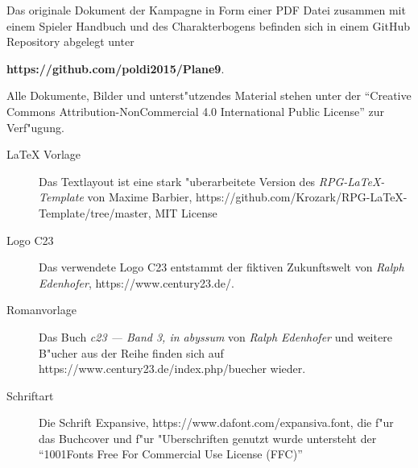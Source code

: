 \newpage
\pagestyle{empty}



Das originale  Dokument der Kampagne in Form einer PDF Datei zusammen mit einem Spieler Handbuch und des Charakterbogens
befinden sich in einem GitHub Repository abgelegt unter 

\textbf{https://github.com/poldi2015/Plane9}. 

Alle Dokumente, Bilder und unterst"utzendes Material stehen unter der ``Creative Commons Attribution-NonCommercial 4.0 
International Public License'' zur Verf"ugung.


\begin{description}
    \item [LaTeX Vorlage] Das Textlayout ist eine stark "uberarbeitete Version des \textit{RPG-LaTeX-Template} von 
        Maxime Barbier, https://github.com/Krozark/RPG-LaTeX-Template/tree/master, MIT License
    \item [Logo C23] Das verwendete Logo C23 entstammt der fiktiven Zukunftswelt von \emph{Ralph  Edenhofer}, 
        \newline{}https://www.century23.de/.
    \item [Romanvorlage] Das Buch \emph{c23 --- Band 3, in abyssum} von \emph{Ralph Edenhofer} und weitere B"ucher aus der Reihe finden 
        sich auf https://www.century23.de/index.php/buecher wieder.
    \item [Schriftart] Die Schrift Expansive, https://www.dafont.com/expansiva.font, die f"ur das Buchcover und f"ur
        "Uberschriften genutzt wurde untersteht der ``1001Fonts Free For Commercial Use License (FFC)''
\end{description}